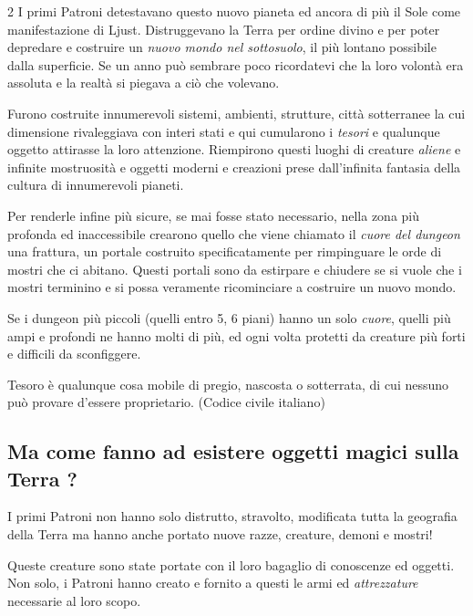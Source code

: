 \begin{multicols}{2}
I primi Patroni detestavano questo nuovo pianeta ed ancora di più il Sole come manifestazione di Ljust.
Distruggevano la Terra per ordine divino e per poter depredare e costruire un \emph{nuovo mondo nel sottosuolo}, il più lontano possibile dalla superficie. Se un anno può sembrare poco ricordatevi che la loro volontà era assoluta e la realtà si piegava a ciò che volevano.

Furono costruite innumerevoli sistemi, ambienti, strutture, città sotterranee la cui dimensione rivaleggiava con interi stati e qui cumularono i \emph{tesori} e qualunque oggetto attirasse la loro attenzione. Riempirono questi luoghi di creature \emph{aliene} e infinite mostruosità e oggetti moderni e creazioni prese dall'infinita fantasia della cultura di innumerevoli pianeti.

Per renderle infine più sicure, se mai fosse stato necessario, nella zona più profonda ed inaccessibile crearono quello che viene chiamato il \emph{cuore del dungeon} una frattura, un portale costruito specificatamente per rimpinguare le orde di mostri che ci abitano. Questi portali sono da estirpare e chiudere se si vuole che i mostri terminino e si possa veramente ricominciare a costruire un nuovo mondo.

Se i dungeon più piccoli (quelli entro 5, 6 piani) hanno un solo \emph{cuore}, quelli più ampi e profondi ne hanno molti di più, ed ogni volta protetti da creature più forti e difficili da sconfiggere.

\medskip

\begin{enfasi}

Tesoro è qualunque cosa mobile di pregio, nascosta o sotterrata, di cui nessuno può provare d'essere proprietario. (Codice civile italiano)

\end{enfasi}

\subsection*{Ma come fanno ad esistere oggetti magici sulla Terra ?}

I primi Patroni non hanno solo distrutto, stravolto, modificata tutta la geografia della Terra ma hanno anche portato nuove razze, creature, demoni e mostri!

Queste creature sono state portate con il loro bagaglio di conoscenze ed oggetti. Non solo, i Patroni hanno creato e fornito a questi le armi ed \emph{attrezzature} necessarie al loro scopo.


\end{multicols}
